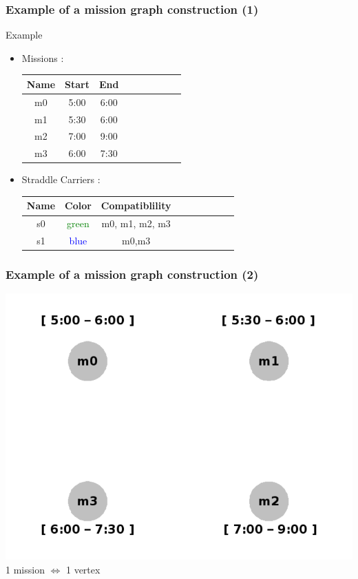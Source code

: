\documentclass{beamer}
\begin{document}
\begin{frame}
 \frametitle{Example of a mission graph construction (1)}
	\begin{exampleblock}{Example}
		\begin{itemize}
		 \item Missions : \\
		\begin{center}
			\begin{tabular}{*{3}{|c|c|c}}
	 	 		\hline
		 		Name	&	Start	&	End\\
				\hline
				m0	&	5:00	&	6:00 \\
				m1	&	5:30	&	6:00 \\
				m2	&	7:00	&	9:00 \\
				m3	&	6:00	&	7:30 \\
				\hline
	 		\end{tabular}
		\end{center}
		\item Straddle Carriers : \\
		\begin{center}
			\begin{tabular}{*{3}{|c|c|c}}
	 	 		\hline
		 		Name	&	Color	& Compatiblility\\
				\hline
				s0	&	\textcolor{green}{green}	& m0, m1, m2, m3\\
				s1	&	\textcolor{blue}{blue}	& m0,m3\\	
				\hline
	 		\end{tabular}
		\end{center}
		
		\end{itemize}

	\end{exampleblock}
	

	
\end{frame}
\begin{frame}
	\frametitle{Example of a mission graph construction (2)}
	\begin{center}
		\includegraphics[height=.50\textheight]{fig/only_vertices.png} \\
	
		1 mission $\Longleftrightarrow$ 1 vertex
	\end{center}
	
\end{frame}
\end{document}
